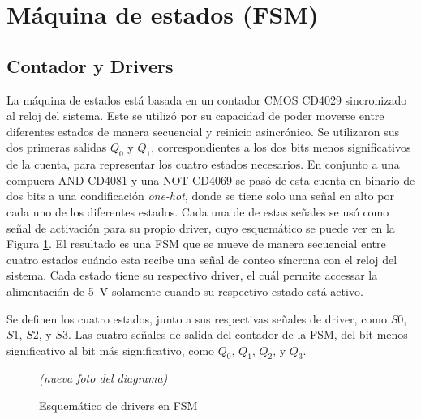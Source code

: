 \documentclass[12pt,onecolumn]{IEEEtran}
\begin{document}




\section{Máquina de estados (FSM)}



\subsection{Contador y Drivers}

La máquina de estados está basada en un contador CMOS CD4029 sincronizado al reloj del sistema. Este se utilizó por su capacidad de poder moverse entre diferentes estados de manera secuencial y reinicio asincrónico. Se utilizaron sus dos primeras salidas $Q_0$ y $Q_1$, correspondientes a los dos bits menos significativos de la cuenta, para representar los cuatro estados necesarios. En conjunto a una compuera AND CD4081 y una NOT CD4069 se pasó de esta cuenta en binario de dos bits a una condificación \textit{one-hot}, donde se tiene solo una señal en alto por cada uno de los diferentes estados. Cada una de de estas señales se usó como señal de activación para su propio driver, cuyo esquemático se puede ver en la Figura \ref{fig:Driver Esquemático}. El resultado es una FSM que se mueve de manera secuencial entre cuatro estados cuándo esta recibe una señal de conteo síncrona con el reloj del sistema. Cada estado tiene su respectivo driver, el cuál permite accessar la alimentación de \qty{5}{V} solamente cuando su respectivo estado está activo.

Se definen los cuatro estados, junto a sus respectivas señales de driver, como $S0$, $S1$, $S2$, y $S3$. Las cuatro señales de salida del contador de la FSM, del bit menos significativo al bit más significativo, como $Q_0$, $Q_1$, $Q_2$, y $Q_3$. 

\begin{figure}[H]
    \centering
    \begin{center}\textit{(nueva foto del diagrama)}\end{center}
    \caption{Esquemático de drivers en FSM}
    \label{fig:Driver Esquemático}
\end{figure}
\end{document}
